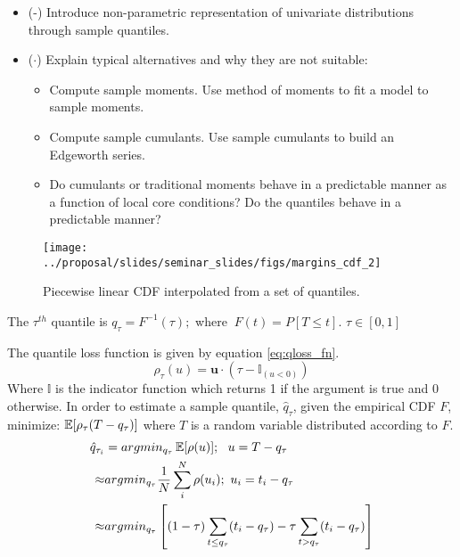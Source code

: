 \begin{itemize}
    \item (\checkmark-) Introduce non-parametric representation of univariate distributions through sample quantiles.
    \item ($\cdot$) Explain typical alternatives and why they are not suitable:
        \begin{itemize}
            \item Compute sample moments.  Use method of moments to fit a model to sample moments.
            \item Compute sample cumulants.  Use sample cumulants to build an Edgeworth series.
            \item Do cumulants or traditional moments behave in a predictable manner as a function of local core conditions?  Do the quantiles behave in a predictable manner?
        \end{itemize}
\end{itemize}

\begin{figure}[H]
    \centering
    \texttt{[image: ../proposal/slides/seminar\_slides/figs/margins\_cdf\_2]}
    \caption[CDF from quantiles.]{Piecewise linear CDF interpolated from a set of quantiles.}
    \label{fig:marginscdf2}
\end{figure}


The $\tau^{th}$ quantile is $q_\tau = F^{-1}(\tau); $ where $\ F(t)=P[T \leq t]$.
$\tau \in [0, 1]$

The quantile loss function is given by equation \ref{eq:qloss_fn}.
\begin{equation}
\rho_\tau( u) = \mathbf u \cdot (\tau - \mathbb{I}_{( u < 0)})
\label{eq:qloss_fn}
\end{equation}
Where $\mathbb{I}$ is the indicator function which returns 1 if the argument is true and 0 otherwise.
In order to estimate a sample quantile, $\hat q_\tau$, given the empirical CDF $F$, minimize: $\operatorname*{\mathbb{E}}[\rho_\tau(T - q_\tau)]$ where $T$ is a random variable distributed according to $F$.
\begin{equation}
            \left.\begin{aligned}
            \hat q_{\tau_i} &= argmin_{q_\tau} \operatorname*{\mathbb{E}}[\rho(u)];\ \  u = T - q_\tau  \\
            \approx & argmin_{q_\tau}  \frac{1}{N} \sum_i^N \rho(u_i); \ u_i = t_i - q_\tau \\
            \approx & argmin_{q_\tau} \left[ (1-\tau) \sum_{t \leq q_\tau}( t_i - q_\tau ) - \tau \sum_{t > q_\tau} (t_i - q_\tau) \right]
            \end{aligned}\right.
\end{equation}



